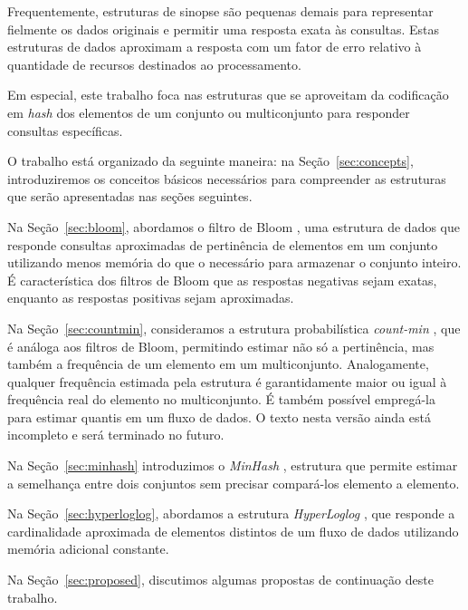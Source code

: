 Frequentemente, estruturas de sinopse são pequenas demais para representar fielmente os dados originais e permitir uma resposta exata às consultas. Estas estruturas de dados aproximam a resposta com um fator de erro relativo à quantidade de recursos destinados ao processamento.

Em especial, este trabalho foca nas estruturas que se aproveitam da codificação em \emph{hash} dos elementos de um conjunto ou multiconjunto para responder consultas específicas.

O trabalho está organizado da seguinte maneira: na Seção~\ref{sec:concepts}, introduziremos os conceitos básicos necessários para compreender as estruturas que serão apresentadas nas seções seguintes.

Na Seção~\ref{sec:bloom}, abordamos o filtro de Bloom \cite{bloom1970space}, uma estrutura de dados que responde consultas aproximadas de pertinência de elementos em um conjunto utilizando menos memória do que o necessário para armazenar o conjunto inteiro. É característica dos filtros de Bloom que as respostas negativas sejam exatas, enquanto as respostas positivas sejam aproximadas.

Na Seção~\ref{sec:countmin}, consideramos a estrutura probabilística \emph{count-min} \cite{cormode2005improved}, que é análoga aos filtros de Bloom, permitindo estimar não só a pertinência, mas também a frequência de um elemento em um multiconjunto. Analogamente, qualquer frequência estimada pela estrutura é garantidamente maior ou igual à frequência real do elemento no multiconjunto. É também possível empregá-la para estimar quantis em um fluxo de dados. O texto nesta versão ainda está incompleto e será terminado no futuro.

Na Seção~\ref{sec:minhash} introduzimos o \emph{MinHash} \cite{broder1997resemblance}, estrutura que permite estimar a semelhança entre dois conjuntos sem precisar compará-los elemento a elemento.

Na Seção~\ref{sec:hyperloglog}, abordamos a estrutura \emph{HyperLoglog} \cite{flajolet2008hyperloglog}, que responde a cardinalidade aproximada de elementos distintos de um fluxo de dados utilizando memória adicional constante.

Na Seção~\ref{sec:proposed}, discutimos algumas propostas de continuação deste trabalho.